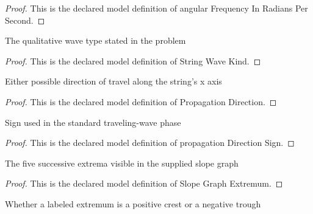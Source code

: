 \begin{proof}
  This is the declared model definition of angular Frequency In Radians Per Second.
\end{proof}
\begin{definition}
  \label{def:physics:phyx-mini-0287:phyxminiproblems-problemphyxmini0287-stringwavekind}
  The qualitative wave type stated in the problem
\end{definition}
\begin{proof}
  This is the declared model definition of String Wave Kind.
\end{proof}
\begin{definition}
  \label{def:physics:phyx-mini-0287:phyxminiproblems-problemphyxmini0287-propagationdirection}
  Either possible direction of travel along the string's x axis
\end{definition}
\begin{proof}
  This is the declared model definition of Propagation Direction.
\end{proof}
\begin{definition}
  \label{def:physics:phyx-mini-0287:phyxminiproblems-problemphyxmini0287-propagationdirectionsign}
  Sign used in the standard traveling-wave phase
\end{definition}
\begin{proof}
  This is the declared model definition of propagation Direction Sign.
\end{proof}
\begin{definition}
  \label{def:physics:phyx-mini-0287:phyxminiproblems-problemphyxmini0287-slopegraphextremum}
  The five successive extrema visible in the supplied slope graph
\end{definition}
\begin{proof}
  This is the declared model definition of Slope Graph Extremum.
\end{proof}
\begin{definition}
  \label{def:physics:phyx-mini-0287:phyxminiproblems-problemphyxmini0287-slopeextremumkind}
  Whether a labeled extremum is a positive crest or a negative trough
\end{definition}
